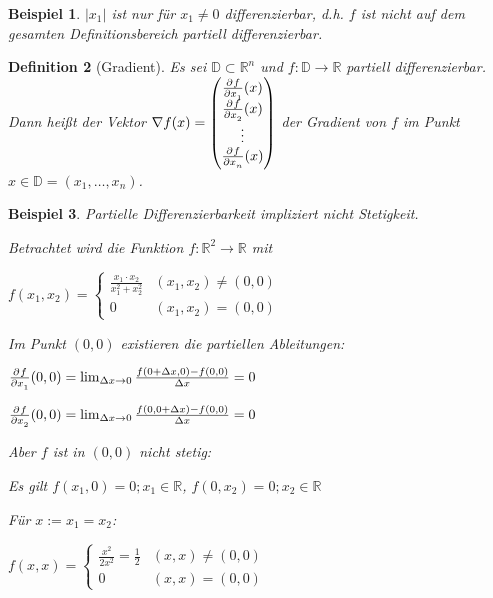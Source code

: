 \documentclass[fontset=ubuntu,11pt,a4paper,fleqn,headsepline]{scrreprt}
\newtheorem{defi}{Definition}[section]
\newtheorem{beispiel}[defi]{Beispiel}
\begin{document}
\begin{multicols}{2}
\begin{beispiel}
        \(\left| x_1 \right|\) ist nur für \(x_1 \neq 0\) differenzierbar, d.h. \(f\) ist nicht auf dem gesamten Definitionsbereich partiell differenzierbar.
    \end{beispiel}
    
    \begin{defi}[Gradient]
        Es sei \(\mathbb{D} \subset \mathbb{R}^n\) und \(f:\mathbb{D} \to \mathbb{R}\) partiell differenzierbar. Dann heißt der Vektor \(\nabla f(x) = \begin{pmatrix}
        \pd{f}{x_1}(x) \\
        \pd{f}{x_2}(x) \\
        \vdots \\
        \pd{f}{x_n}(x) \\
        \end{pmatrix}\) der Gradient von \(f\) im Punkt \(x\in\mathbb{D}= (x_1,\dots,x_n)\).
    \end{defi}
    
    \begin{beispiel}
        Partielle Differenzierbarkeit impliziert nicht Stetigkeit.
        
        Betrachtet wird die Funktion \(f:\mathbb{R}^2\to\mathbb{R}\) mit
        
        \(f(x_1,x_2) = \begin{cases}
        \frac{x_1\cdot x_2}{x_1^2 + x_2^2} & (x_1,x_2) \ne (0,0) \\
        0 & (x_1,x_2) = (0,0)
        \end{cases}\)
        
        Im Punkt \((0,0)\) existieren die partiellen Ableitungen:
        
        \(\pd{f}{x_1}(0,0) = \lim_{\Delta x\to0}{\frac{f(0+\Delta x,0)-f(0,0)}{\Delta x}} = 0\)
        
        \(\pd{f}{x_2}(0,0) = \lim_{\Delta x\to0}{\frac{f(0,0+\Delta x)-f(0,0)}{\Delta x}} = 0\)
        
        Aber \(f\) ist in \((0,0)\) nicht stetig:
        
        Es gilt \(f(x_1,0) = 0; x_1 \in \mathbb{R}\), \(f(0,x_2) = 0; x_2 \in \mathbb{R}\)
        
        Für \(x := x_1 = x_2\):
        
        \(f(x,x)=\begin{cases}\frac{x^2}{2x^2}=\frac{1}{2} & (x,x) \ne (0,0) \\ 0 & (x,x) = (0,0)\end{cases}\)
    \end{beispiel}
    

\end{multicols}
\end{document}
